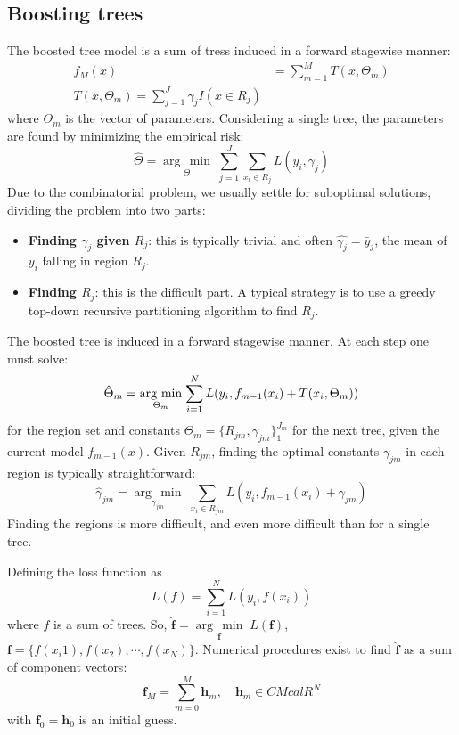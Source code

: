 \documentclass[12pt, letterpaper]{article}
\theoremstyle{definition}
\DeclarePairedDelimiter\autobracket{(}{)}
\newcommand{\br}[1]{\autobracket*{#1}}
\newcommand{\argmin}[1]{\underset{#1}{\operatorname{arg}\,\operatorname{min}}\;}
\begin{document}
\subsection{Boosting trees}
The boosted tree model is a sum of tress induced in a forward stagewise manner:
\begin{equation}
\begin{aligned}
f_M(x) &= \sum_{m=1}^M T(x, \Theta_m)\\
T(x, \Theta_m) = \sum_{j=1}^J\gamma_j I(x \in R_j)
\end{aligned}
\end{equation}
where $\Theta_m$ is the vector of parameters. Considering a single tree, the parameters are found by minimizing the empirical risk:
\begin{equation}
\hat{\Theta} = \argmin{\Theta}{\sum_{j=1}^J\sum_{x_i \in R_j}L(y_i, \gamma_j)}
\end{equation}
Due to the combinatorial problem, we usually settle for suboptimal solutions, dividing the problem into two parts:
\begin{itemize}
\item \textbf{Finding $\gamma_j$ given $R_j$}: this is typically trivial and often $\hat{\gamma_j} = \bar{y}_j$, the mean of $y_i$ falling in region $R_j$.
\item \textbf{Finding $R_j$}: this is the difficult part. A typical strategy is to use a greedy top-down recursive partitioning  algorithm to find $R_j$.
\end{itemize}

The boosted tree is induced in a forward stagewise manner. At each step one must solve:
\begin{equation}
\hat{\Theta}_m = \argmin{\Theta_m}{\sum_{i=1}^N L\br{y_i, f_{m-1}(x_i)+T\br{x_i, \Theta_m}}}
\end{equation}
for the region set and constants $\Theta_m = \{R_{jm},\gamma_{jm}\}_1^{J_m}$ for the next tree, given the current model $f_{m-1}(x)$. Given $R_{jm}$, finding the optimal constants $\gamma_{jm}$ in each region is typically straightforward:
\begin{equation}
\hat{\gamma}_{jm} = \argmin{\gamma_{jm}}{\sum_{x_i \in R_{jm}}} L(y_i, f_{m-1}(x_i)+\gamma_{jm})
\end{equation}
Finding the regions is more difficult, and even more difficult than for a single tree.

Defining the loss function as
\begin{equation}
L(f) = \sum_{i=1}^N L(y_i, f(x_i))
\end{equation}
where $f$ is a sum of trees. So, $\hat{\mathbf{f}} =\argmin{\mathbf{f}}{L(\mathbf{f})}$, $\mathbf{f}=\{f(x_i1), f(x_2), \cdots, f(x_N)\}$. Numerical procedures exist to find $\hat{\mathbf{f}}$ as a sum of component vectors:
\begin{equation}
\mathbf{f}_M = \sum_{m=0}^M \mathbf{h}_m, \quad \mathbf{h}_m \in CMcal{R}^N
\end{equation}
with $\mathbf{f}_0=\mathbf{h}_0$ is an initial guess.
\end{document}
